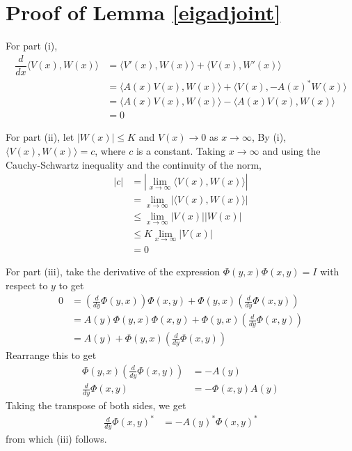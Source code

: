 \documentclass[thesis.tex]{subfiles}
\begin{document}
\section{Proof of Lemma \ref{eigadjoint}}

For part (i), 
\begin{align*}
\dfrac{d}{dx}\langle V(x), W(x) \rangle &= 
\langle V'(x), W(x) \rangle + \langle V(x), W'(x) \rangle \\
&= \langle A(x)V(x), W(x) \rangle + \langle V(x), -A(x)^* W(x) \rangle \\
&= \langle A(x)V(x), W(x) \rangle - \langle A(x)V(x), W(x) \rangle \\
&= 0
\end{align*}

For part (ii), let $|W(x)| \leq K$ and $V(x) \rightarrow 0$ as $x \rightarrow \infty$, By (i), $\langle V(x), W(x) \rangle = c$, where $c$ is a constant. Taking $x \rightarrow \infty$ and using the Cauchy-Schwartz inequality and the continuity of the norm,
\begin{align*}
|c| &= \left| \lim_{x\rightarrow \infty} \langle V(x), W(x) \rangle \right| \\
&= \lim_{x\rightarrow \infty} \left| \langle V(x), W(x) \rangle \right| \\
&\leq \lim_{x\rightarrow \infty} |V(x)||W(x)| \\
&\leq K \lim_{x\rightarrow \infty} |V(x)| \\
&= 0
\end{align*}

For part (iii), take the derivative of the expression $\Phi(y, x)\Phi(x, y) = I$ with respect to $y$ to get
\begin{align*}
0 &= \left(\frac{d}{dy}\Phi(y, x)\right) \Phi(x, y) +
\Phi(y, x)\left(\frac{d}{dy}\Phi(x, y)\right) \\
&= A(y)\Phi(y, x) \Phi(x, y) +
\Phi(y, x)\left(\frac{d}{dy}\Phi(x, y)\right) \\
&= A(y) + \Phi(y, x)\left(\frac{d}{dy}\Phi(x, y)\right) 
\end{align*}
Rearrange this to get
\begin{align*}
\Phi(y, x)\left(\frac{d}{dy}\Phi(x, y)\right) &= -A(y) \\
\frac{d}{dy}\Phi(x, y) &= -\Phi(x, y) A(y) 
\end{align*}
Taking the transpose of both sides, we get
\begin{align*}
\frac{d}{dy}\Phi(x, y)^* &= -A(y)^* \Phi(x, y)^*  
\end{align*}
from which (iii) follows.
\end{document}
